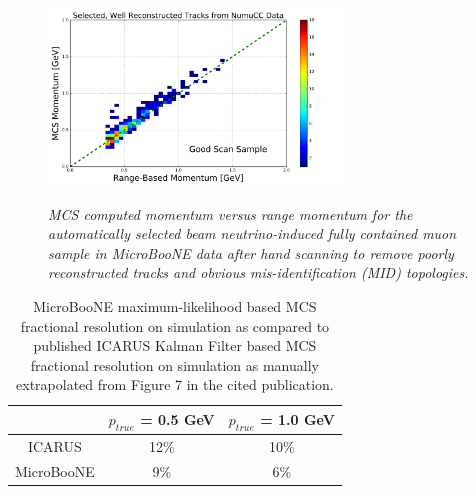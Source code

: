 \documentclass[a4paper,11pt]{article}
\begin{document}
\begin{figure}[ht!]
\centering
	\includegraphics[width=0.7\textwidth]{Figures/MCS_range_momentum_DataRecoTracks_goodhandscan.png} \\
\caption{\textit{MCS computed momentum versus range momentum for the automatically selected beam neutrino-induced fully contained muon sample in MicroBooNE data after hand scanning to remove poorly reconstructed tracks and obvious mis-identification (MID) topologies.}}\label{realdata_goodhandscan_fig}
\end{figure}

\begin{table}[htbp]
\centering
\caption{\label{icarus_comparison_table} MicroBooNE maximum-likelihood based MCS fractional resolution on simulation as compared to published ICARUS Kalman Filter based MCS fractional resolution on simulation \cite{icarus_mcs_paper} as manually extrapolated from Figure 7 in the cited publication.}
\smallskip
\begin{tabular}{|c|c|c|}
\hline
 & $p_{true}$ = 0.5 GeV& $p_{true}$ = 1.0 GeV\\
\hline
ICARUS & 12\% & 10\%\\
MicroBooNE & 9\% & 6\%\\
\hline
\end{tabular}
\end{table}
\end{document}
